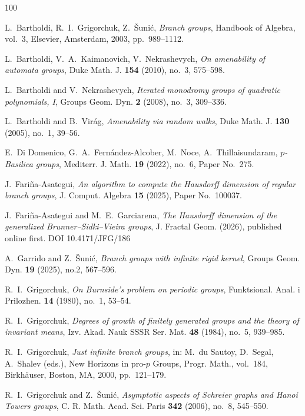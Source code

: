 \documentclass[11pt,leqno]{amsart}
\theoremstyle{plain}
\numberwithin{equation}{section}
\begin{document}
\begin{thebibliography}{100}

L.~Bartholdi, R.~I.~Grigorchuk, Z.~\v{S}uni\'c,
\emph{Branch groups},
Handbook of Algebra, vol.~3, Elsevier, Amsterdam, 2003, pp.~989--1112.

L.~Bartholdi, V.~A.~Kaimanovich, V.~Nekrashevych,
\emph{On amenability of automata groups},
Duke Math. J. \textbf{154} (2010), no.~3, 575--598.

L.~Bartholdi and V.~Nekrashevych,
\emph{Iterated monodromy groups of quadratic polynomials, I},
Groups Geom. Dyn. \textbf{2} (2008), no.~3, 309--336.

L.~Bartholdi and B.~Vir\'ag,
\emph{Amenability via random walks},
Duke Math. J. \textbf{130} (2005), no.~1, 39--56.

E.~Di Domenico, G.~A.~Fern\'andez-Alcober, M.~Noce, A.~Thillaisundaram,
\emph{$p$-Basilica groups},
Mediterr. J. Math. \textbf{19} (2022), no.~6, Paper No.~275.

J.~Fari\~na-Asategui,
\emph{An algorithm to compute the Hausdorff dimension of regular branch groups},
J. Comput. Algebra \textbf{15} (2025), Paper No.~100037.

J.~Fari{\~n}a-Asategui and M.~E.~Garciarena,
\emph{The Hausdorff dimension of the generalized Brunner--Sidki--Vieira groups},
J. Fractal Geom. (2026), published online first. DOI 10.4171/JFG/186

A.~Garrido and Z.~\v{S}uni\'c,
\emph{Branch groups with infinite rigid kernel},
Groups Geom. Dyn. \textbf{19} (2025), no.2, 567--596.

R.~I.~Grigorchuk,
\emph{On Burnside's problem on periodic groups},
Funktsional. Anal. i Prilozhen. \textbf{14} (1980), no.~1, 53--54.

R.~I.~Grigorchuk,
\emph{Degrees of growth of finitely generated groups and the theory of invariant means},
Izv. Akad. Nauk SSSR Ser. Mat. \textbf{48} (1984), no.~5, 939--985.

R.~I.~Grigorchuk,
\emph{Just infinite branch groups},
in: M.~du Sautoy, D.~Segal, A.~Shalev (eds.), New Horizons in pro-$p$ Groups,
Progr. Math., vol.~184, Birkh\"auser, Boston, MA, 2000, pp.~121--179.

R.~I.~Grigorchuk and Z.~\v{S}uni\'{c},
\emph{Asymptotic aspects of Schreier graphs and Hanoi Towers groups},
C. R. Math. Acad. Sci. Paris \textbf{342} (2006), no.~8, 545--550.


\end{thebibliography}
\end{document}
